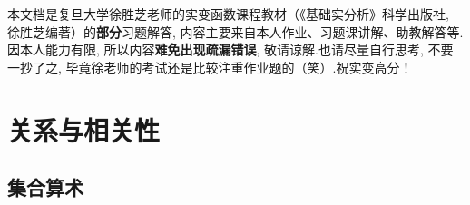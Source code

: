 \theoremstyle{plain}\newtheorem*{1}{习题1}
\theoremstyle{plain}\newtheorem*{2}{习题2}
\theoremstyle{plain}\newtheorem*{3}{习题3}
\theoremstyle{plain}\newtheorem*{4}{习题4}
\theoremstyle{plain}\newtheorem*{5}{习题5}
\theoremstyle{plain}\newtheorem*{6}{习题6}
\theoremstyle{plain}\newtheorem*{7}{习题7}
\theoremstyle{plain}\newtheorem*{8}{习题8}
\theoremstyle{plain}\newtheorem*{9}{习题9}
\theoremstyle{plain}\newtheorem*{10}{习题10}
\theoremstyle{plain}\newtheorem*{11}{习题11}
\theoremstyle{plain}\newtheorem*{12}{习题12}
\theoremstyle{plain}\newtheorem*{13}{习题13}
\theoremstyle{plain}\newtheorem*{14}{习题14}
\theoremstyle{plain}\newtheorem*{15}{习题15}

\newenvironment{solution}
    {\textbf{解答:}}
    {}

\newenvironment{hint}
    {\textbf{提示:}}
    {}

\renewcommand{\qed}{\quad\qedsymbol}

本文档是复旦大学徐胜芝老师的实变函数课程教材（《基础实分析》科学出版社, 徐胜芝编著）的\textbf{部分}习题解答, 内容主要来自本人作业、习题课讲解、助教解答等.因本人能力有限, 所以内容\textbf{难免出现疏漏错误}, 敬请谅解.也请尽量自行思考, 不要一抄了之, 毕竟徐老师的考试还是比较注重作业题的（笑）.祝实变高分！

\section{关系与相关性}
\subsection{集合算术}

